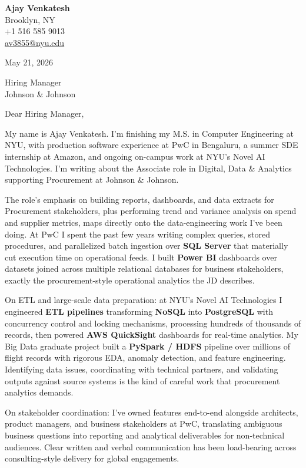\documentclass[letterpaper,11pt]{article}
\begin{document}
\begin{flushleft}
\textbf{\large Ajay Venkatesh} \\
Brooklyn, NY \\
+1 516 585 9013 \\
\href{mailto:av3855@nyu.edu}{av3855@nyu.edu}
\end{flushleft}
\vspace{10pt}
May 21, 2026
\vspace{6pt}

Hiring Manager \\
Johnson \& Johnson

\vspace{10pt}

Dear Hiring Manager,

My name is Ajay Venkatesh. I'm finishing my M.S. in Computer Engineering at NYU, with production software experience at PwC in Bengaluru, a summer SDE internship at Amazon, and ongoing on-campus work at NYU's Novel AI Technologies. I'm writing about the Associate role in Digital, Data \& Analytics supporting Procurement at Johnson \& Johnson.

The role's emphasis on building reports, dashboards, and data extracts for Procurement stakeholders, plus performing trend and variance analysis on spend and supplier metrics, maps directly onto the data-engineering work I've been doing. At PwC I spent the past few years writing complex queries, stored procedures, and parallelized batch ingestion over \textbf{SQL Server} that materially cut execution time on operational feeds. I built \textbf{Power BI} dashboards over datasets joined across multiple relational databases for business stakeholders, exactly the procurement-style operational analytics the JD describes.

On ETL and large-scale data preparation: at NYU's Novel AI Technologies I engineered \textbf{ETL pipelines} transforming \textbf{NoSQL} into \textbf{PostgreSQL} with concurrency control and locking mechanisms, processing hundreds of thousands of records, then powered \textbf{AWS QuickSight} dashboards for real-time analytics. My Big Data graduate project built a \textbf{PySpark / HDFS} pipeline over millions of flight records with rigorous EDA, anomaly detection, and feature engineering. Identifying data issues, coordinating with technical partners, and validating outputs against source systems is the kind of careful work that procurement analytics demands.

On stakeholder coordination: I've owned features end-to-end alongside architects, product managers, and business stakeholders at PwC, translating ambiguous business questions into reporting and analytical deliverables for non-technical audiences. Clear written and verbal communication has been load-bearing across consulting-style delivery for global engagements.
\end{document}
